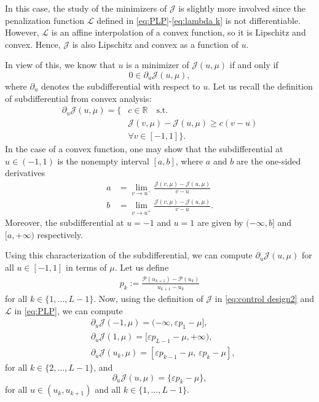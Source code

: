 \documentclass[twocolumn]{autart}    %
\begin{document}
In this case, the study of the minimizers of $\mathcal{J}$ is slightly more involved since the penalization function $\mathcal{L}$ defined in \eqref{eq:PLP}-\eqref{eq:lambda k} is not differentiable. However, $\mathcal{L}$ is an affine interpolation of a convex function, so it is Lipschitz and convex.  Hence, $\mathcal{J}$ is also Lipschitz and convex as a function of $u$. 

In view of this, we know that $u$ is a minimizer of $\mathcal{J} (u,\mu)$ if and only if
\begin{equation}\label{opti cond subdiff}
	0\in \partial_u \mathcal{J} (u,\mu),
\end{equation}
where $\partial_u$ denotes the subdifferential with respect to $u$. Let us recall the definition of subdifferential from convex analysis:
\begin{align*}
	\partial_u \mathcal{J} (u,\mu) = \{  & c\in \mathbb{R} \quad \text{s.t.} 
	\\
	&\mathcal{J} (v,\mu) - \mathcal{J} (u,\mu) \geq c(v-u) 
	\\
	& \forall v\in [-1,1] \}. 
\end{align*}
In the case of a convex function, one may show that the subdifferential at $u\in (-1,1)$ is the nonempty interval $[a,b]$, where $a$ and $b$ are the one-sided derivatives
\begin{align*}
	a &= \lim_{v\to u^-} \frac{\mathcal{J} (v,\mu) - \mathcal{J}(u,\mu)}{v-u} 
	\\[5pt]
	b &= \lim_{v\to u^+} \frac{\mathcal{J} (v,\mu) - \mathcal{J}(u,\mu)}{v-u}. 
\end{align*}
Moreover, the subdifferential at $u=-1$ and $u=1$ are given by $(-\infty, b]$ and $[a,+\infty)$ respectively.

Using this characterization of the subdifferential, we can compute $\partial_u\mathcal{J}(u,\mu)$ for all $u\in [-1,1]$ in terms of $\mu$.
Let us define
\begin{align*} 
	p_k := \frac{\mathcal{P}(u_{k+1}) - \mathcal{P} (u_k) }{u_{k+1} - u_k} 
\end{align*} 
for all $k\in \{1, \ldots, L-1\}$. Now, using the definition of $\mathcal{J}$ in \eqref{eq:control design2} and $\mathcal{L}$ in \eqref{eq:PLP}, we can compute
\begin{align*}
	&\partial_u \mathcal{J} (-1,\mu) = (-\infty, \varepsilon p_1 -\mu], 
	\\[5pt]
	&\partial_u \mathcal{J} (1,\mu) = [\varepsilon p_{L-1} -\mu, +\infty), 
	\\[5pt]
	&\partial_u \mathcal{J} (u_k,\mu) = [\varepsilon p_{k-1} -\mu,  \, \varepsilon p_k -\mu],
\end{align*}
for all $k\in \{ 2, \ldots, L-1\}$, and
\begin{equation*}
	\partial_u \mathcal{J}(u,\mu) = \{\varepsilon p_k -\mu\},
\end{equation*}
for all $u\in (u_k, u_{k+1})$ and all $k\in \{ 1, \ldots, L-1 \}$.
\end{document}
